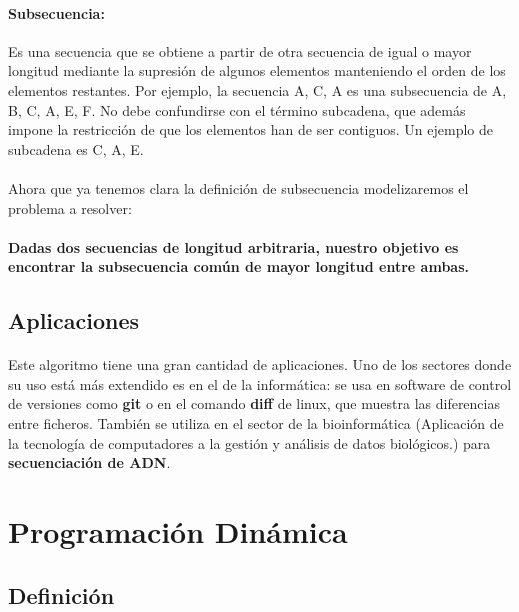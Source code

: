 \documentclass{article}
\begin{document}
		\paragraph{Subsecuencia:}
		Es una secuencia que se obtiene a partir de otra secuencia de igual o mayor longitud mediante la supresión de algunos elementos manteniendo el orden de los elementos restantes. Por ejemplo, la secuencia A, C, A es una subsecuencia de A, B, C, A, E, F.
		\newline
		No debe confundirse con el término subcadena, que además impone la restricción de que los elementos han de ser contiguos. Un ejemplo de subcadena es  C, A, E.

		\paragraph{}
		Ahora que ya tenemos clara la definición de subsecuencia modelizaremos el problema a resolver:
		
		\paragraph{}
		\textbf{Dadas dos secuencias de longitud arbitraria, nuestro objetivo es encontrar la subsecuencia común de mayor longitud entre ambas.}

	\subsection{Aplicaciones}
	
		\paragraph{}
		Este algoritmo tiene una gran cantidad de aplicaciones. Uno de los sectores donde su uso está más extendido es en el de la informática: se usa en software de control de versiones como \textbf{git} o en el comando \textbf{diff} de linux, que muestra las diferencias entre ficheros. También se utiliza en el sector de la bioinformática (Aplicación de la tecnología de computadores a la gestión y análisis de datos biológicos.) para \textbf{secuenciación de ADN}.

\section{Programación Dinámica}

	\subsection{Definición}
	
\end{document}
